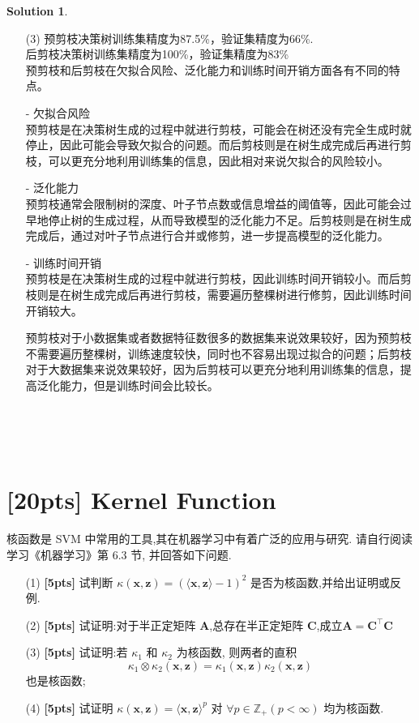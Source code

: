 \documentclass[a4paper,UTF8]{article}
\numberwithin{equation}{section}
\theoremstyle{definition}
\newtheorem*{solution}{Solution}
\def \A {\mathbf{A}}
\def \C {\mathbf{C}}
\def \x {\mathbf{x}}
\def \z {\mathbf{z}}
\begin{document}
\begin{solution}
\begin{enumerate}
		\item[(3)]
		预剪枝决策树训练集精度为87.5\%，验证集精度为66\%. \\
		后剪枝决策树训练集精度为100\%，验证集精度为83\%\\
		预剪枝和后剪枝在欠拟合风险、泛化能力和训练时间开销方面各有不同的特点。

		- 欠拟合风险\\
		预剪枝是在决策树生成的过程中就进行剪枝，可能会在树还没有完全生成时就停止，因此可能会导致欠拟合的问题。而后剪枝则是在树生成完成后再进行剪枝，可以更充分地利用训练集的信息，因此相对来说欠拟合的风险较小。
		
		- 泛化能力\\
		预剪枝通常会限制树的深度、叶子节点数或信息增益的阈值等，因此可能会过早地停止树的生成过程，从而导致模型的泛化能力不足。后剪枝则是在树生成完成后，通过对叶子节点进行合并或修剪，进一步提高模型的泛化能力。
		
		- 训练时间开销\\
		预剪枝是在决策树生成的过程中就进行剪枝，因此训练时间开销较小。而后剪枝则是在树生成完成后再进行剪枝，需要遍历整棵树进行修剪，因此训练时间开销较大。
		
		预剪枝对于小数据集或者数据特征数很多的数据集来说效果较好，因为预剪枝不需要遍历整棵树，训练速度较快，同时也不容易出现过拟合的问题；后剪枝对于大数据集来说效果较好，因为后剪枝可以更充分地利用训练集的信息，提高泛化能力，但是训练时间会比较长。

		
	\end{enumerate}
	~\\
	~\\
	~\\
\end{solution}

\newpage

\section{[20pts] Kernel Function}
核函数是 SVM 中常用的工具,其在机器学习中有着广泛的应用与研究. 请自行阅读学习《机器学习》第 6.3 节, 并回答如下问题.
\begin{enumerate}
	\item[(1)] \textbf{[5pts]} 试判断 $\kappa(\x, \z) = \left(\langle\x, \z\rangle - 1\right)^2$ 是否为核函数,并给出证明或反例.
	\item[(2)] \textbf{[5pts]} 试证明:对于半正定矩阵 $\A$,总存在半正定矩阵 $\C$,成立$\A = \C^\top \C$
	\item[(3)] \textbf{[5pts]} 试证明:若 $\kappa_1$ 和 $\kappa_2$ 为核函数, 则两者的直积
	\[
	\kappa_1 \otimes \kappa_2(\x, \z)=\kappa_1(\x, \z) \kappa_2(\x, \z)
	\]
	也是核函数;
	\item[(4)] \textbf{[5pts]} 试证明 $\kappa(\x, \z) = \langle\x, \z\rangle^p$ 对 $\forall p\in\mathbb{Z}_+(p<\infty)$ 均为核函数.

	
\end{enumerate}
\end{document}
